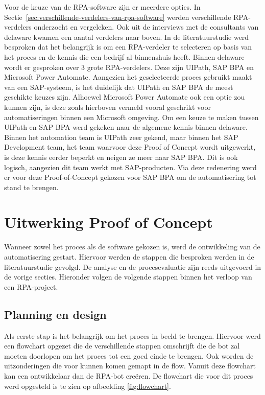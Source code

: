 Voor de keuze van de RPA-software zijn er meerdere opties. In Sectie~\ref{sec:verschillende-verdelers-van-rpa-software} werden verschillende RPA-verdelers onderzocht en vergeleken. Ook uit de interviews met de consultants van delaware kwamen een aantal verdelers naar boven. In de literatuurstudie werd besproken dat het belangrijk is om een RPA-verdeler te selecteren op basis van het proces en de kennis die een bedrijf al binnenshuis heeft.
Binnen delaware wordt er gesproken over 3 grote RPA-verdelers. Deze zijn UIPath, SAP BPA en Microsoft Power Automate. Aangezien het geselecteerde proces gebruikt maakt van een SAP-systeem, is het duidelijk dat UIPath en SAP BPA de meest geschikte keuzes zijn. Alhoewel Microsoft Power Automate ook een optie zou kunnen zijn, is deze zoals hierboven vermeld vooral geschrikt voor automatiseringen binnen een Microsoft omgeving.
Om een keuze te maken tussen UIPath en SAP BPA werd gekeken naar de algemene kennis binnen delaware. Binnen het automation team is UIPath zeer gekend, maar binnen het SAP Development team, het team waarvoor deze Proof of Concept wordt uitgewerkt, is deze kennis eerder beperkt en neigen ze meer naar SAP BPA. Dit is ook logisch, aangezien dit team werkt met SAP-producten.
Via deze redenering werd er voor deze Proof-of-Concept gekozen voor SAP BPA om de automatisering tot stand te brengen.

\section{Uitwerking Proof of Concept}
\label{sec:uitwerking-proof-of-concept}

Wanneer zowel het proces als de software gekozen is, werd de ontwikkeling van de automatisering gestart. Hiervoor werden de stappen die besproken werden in de literatuurstudie gevolgd.
De analyse en de procesevaluatie zijn reeds uitgevoerd in de vorige secties. Hieronder volgen de volgende stappen binnen het verloop van een RPA-project.

\subsection{Planning en design}
\label{subsec:planning-design}

Als eerste stap is het belangrijk om het proces in beeld te brengen. Hiervoor werd een flowchart opgezet die de verschillende stappen omschrijft die de bot zal moeten doorlopen om het proces tot een goed einde te brengen. Ook worden de uitzonderingen die voor kunnen komen gemapt in de flow.
Vanuit deze flowchart kan een ontwikkelaar dan de RPA-bot creëren.
De flowchart die voor dit proces werd opgesteld is te zien op afbeelding \ref{fig:flowchart}.

